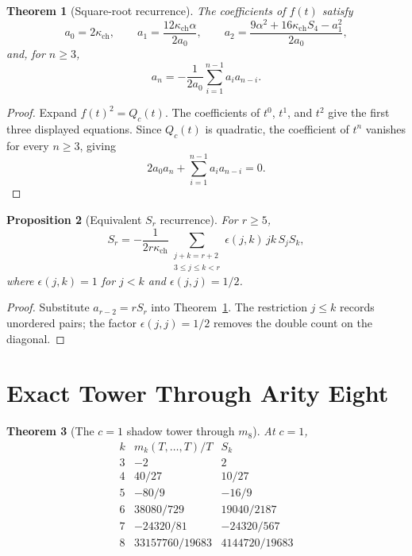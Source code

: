 \documentclass[11pt]{article}
\newtheorem{theorem}{Theorem}[section]
\newtheorem{proposition}[theorem]{Proposition}
\begin{document}
\begin{theorem}[Square-root recurrence]
\label{thm:square-root-recurrence}
The coefficients of $f(t)$ satisfy
\[
  a_0=2\kappa_{\mathrm{ch}},\qquad
  a_1=\frac{12\kappa_{\mathrm{ch}}\alpha}{2a_0},\qquad
  a_2=\frac{9\alpha^2+16\kappa_{\mathrm{ch}}S_4-a_1^2}{2a_0},
\]
and, for $n\geq3$,
\[
  a_n=-\frac{1}{2a_0}\sum_{i=1}^{n-1}a_i a_{n-i}.
\]
\end{theorem}

\begin{proof}
Expand $f(t)^2=Q_c(t)$. The coefficients of $t^0$, $t^1$, and $t^2$
give the first three displayed equations. Since $Q_c(t)$ is quadratic,
the coefficient of $t^n$ vanishes for every $n\geq3$, giving
\[
  2a_0a_n+\sum_{i=1}^{n-1}a_i a_{n-i}=0.
\]
\end{proof}

\begin{proposition}[Equivalent $S_r$ recurrence]
\label{prop:sr-recurrence}
For $r\geq5$,
\[
  S_r
  =
  -\frac{1}{2r\kappa_{\mathrm{ch}}}
  \sum_{\substack{j+k=r+2\\3\leq j\leq k<r}}
  \epsilon(j,k)\,jk\,S_jS_k,
\]
where $\epsilon(j,k)=1$ for $j<k$ and $\epsilon(j,j)=1/2$.
\end{proposition}

\begin{proof}
Substitute $a_{r-2}=rS_r$ into
Theorem~\ref{thm:square-root-recurrence}. The restriction
$j\leq k$ records unordered pairs; the factor $\epsilon(j,j)=1/2$
removes the double count on the diagonal.
\end{proof}

\section{Exact Tower Through Arity Eight}

\begin{theorem}[The $c=1$ shadow tower through $m_8$]
\label{thm:c1-shadow-tower-through-eight}
At $c=1$,
\[
\begin{array}{c|c|c}
k & m_k(T,\ldots,T)/T & S_k\\
\hline
3 & -2 & 2\\
4 & 40/27 & 10/27\\
5 & -80/9 & -16/9\\
6 & 38080/729 & 19040/2187\\
7 & -24320/81 & -24320/567\\
8 & 33157760/19683 & 4144720/19683
\end{array}
\]
\end{theorem}
\end{document}
